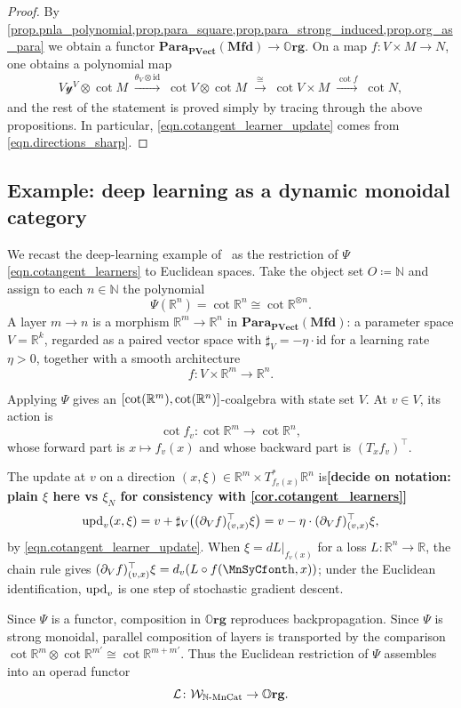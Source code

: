\documentclass[11pt, oneside, article]{memoir}
\theoremstyle{definition}
\theoremstyle{plain}
\DeclarePairedDelimiter{\ihom}{[}{]}
\newcommand{\cat}[1]{\mathcal{#1}}%
\newcommand{\Cat}[1]{\mathbf{#1}}%
\newcommand{\id}{\mathrm{id}}
\newcommand{\To}[2][]{\xrightarrow[#1]{#2}}
\newcommand{\tn}[1]{\textnormal{#1}}
\newcommand{\nn}{\mathbb{N}}
\newcommand{\rr}{\mathbb{R}}
\newcommand{\upd}{\tn{upd}}
\newcommand{\yon}{\mathcal{y}}
\newcommand{\org}{{\mathbb{O}\Cat{rg}}}
\newcommand{\mfd}{\Cat{Mfd}}
\newcommand{\tpow}[1]{^{\otimes #1}}
\newcommand{\Para}{\Cat{Para}}
\newcommand{\para}[2]{\Para_{#1}(#2)}
\newcommand{\pvect}{\Cat{PVect}}
\newcommand{\smallsquare}{\mbox{\MnSyCfont\symbol{"68}}}
\newcommand{\blank}{\mathord{\smallsquare}}
\begin{document}
\begin{proof}
By \cref{prop.pnla_polynomial,prop.para_square,prop.para_strong_induced,prop.org_as_para} we obtain a functor $\para{\pvect}{\mfd}\to\org$. On a map $f\colon V\times M\to N$, one obtains a polynomial map
\[
V\yon^V\otimes\cot{M}\;\To{\theta_V\otimes\id}\;\cot{V}\otimes\cot{M}\;\To{\cong}\;\cot{V\times M}\;\To{\cot{f}}\;\cot{N},
\]
and the rest of the statement is proved simply by tracing through the above propositions. In particular, \eqref{eqn.cotangent_learner_update} comes from \eqref{eqn.directions_sharp}.
\end{proof}

\subsection{Example: deep learning as a dynamic monoidal category}\label{sec.deep_learning}

We recast the deep-learning example of~\cite{shapiro2022dynamic} as the restriction of $\Psi$ \eqref{eqn.cotangent_learners} to Euclidean spaces. Take the object set $O\coloneqq\nn$ and assign to each $n\in\nn$ the polynomial
\[
\Psi(\rr^n)=\cot{\rr^n}\cong{\cot{\rr}}\tpow n.
\]
A layer $m\to n$ is a morphism $\rr^m\to\rr^n$ in $\para{\pvect}{\mfd}$: a parameter space $V=\rr^k$, regarded as a paired vector space with $\sharp_V=-\eta\cdot\id$ for a learning rate $\eta>0$, together with a smooth architecture
\[
f\colon V\times\rr^m\to\rr^n.
\]

Applying $\Psi$ gives an $\ihom{\cot{\rr^m},\cot{\rr^n}}$-coalgebra with state set $V$. At $v\in V$, its action is
\[
\cot{f_v}\colon\cot{\rr^m}\to\cot{\rr^n},
\]
whose forward part is $x\mapsto f_v(x)$ and whose backward part is $(T_x f_v)^\top$.

The update at $v$ on a direction $(x,\xi)\in\rr^m\times T^*_{f_v(x)}\rr^n$ is\textbf{[decide on notation: plain $\xi$ here vs $\xi_N$ for consistency with \cref{cor.cotangent_learners}]}
\[
\upd_v(x,\xi)=v+\sharp_V\bigl((\partial_Vf)_{(v,x)}^\top\xi\bigr)=v-\eta\cdot(\partial_Vf)_{(v,x)}^\top\xi,
\]
by \eqref{eqn.cotangent_learner_update}. When $\xi=dL|_{f_v(x)}$ for a loss $L\colon\rr^n\to\rr$, the chain rule gives $(\partial_Vf)_{(v,x)}^\top\xi=d_v(L\circ f(\blank,x))$; under the Euclidean identification, $\upd_v$ is one step of stochastic gradient descent.

Since $\Psi$ is a functor, composition in $\org$ reproduces backpropagation. Since $\Psi$ is strong monoidal, parallel composition of layers is transported by the comparison $\cot{\rr^m}\otimes\cot{\rr^{m'}}\cong\cot{\rr^{m+m'}}$. Thus the Euclidean restriction of $\Psi$ assembles into an operad functor
\[\cat{L}\colon\cat{W}_{\nn\tn{-MnCat}}\to\org.\]
\end{document}
